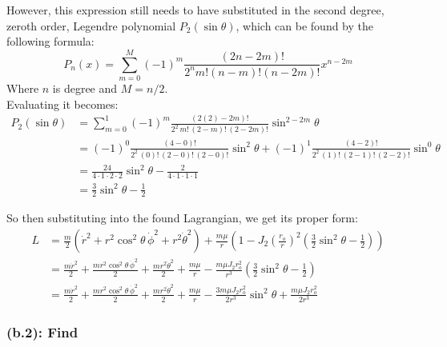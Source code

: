 \documentclass[titlepage]{article}
\begin{document}
However, this expression still needs to have substituted in the second degree, zeroth order, Legendre polynomial $P_2(\sin\theta)$, which can be found by the following formula:
\begin{equation}
	P_n(x)=\sum_{m=0}^{M}(-1)^m\frac{(2n-2m)!}{2^n m!(n-m)!(n-2m)!}x^{n-2m}
\end{equation} 
Where $n$ is degree and $M=n/2$.\\

Evaluating it becomes:
\begin{equation}
	\begin{split}
		P_2(\sin\theta)&=\sum_{m=0}^{1}(-1)^m\frac{(2(2)-2m)!}{2^2\,m!\,(2-m)!\,(2-2m)!}\sin^{2-2m}\theta \\
		&=(-1)^0\frac{(4-0)!}{2^2\,(0)!\,(2-0)!\,(2-0)!}\sin^{2}\theta+(-1)^1\frac{(4-2)!}{2^2\,(1)!\,(2-1)!\,(2-2)!}\sin^{0}\theta \\
		&=\frac{24}{4\cdot1\cdot2\cdot2}\sin^2\theta-\frac{2}{4\cdot1\cdot1\cdot1} \\
		&=\frac{3}{2}\sin^2\theta-\frac{1}{2}
	\end{split}
\end{equation}

\begin{mdframed}[linewidth=1pt, innertopmargin=10pt, innerbottommargin=10pt]
	So then substituting into the found Lagrangian, we get its proper form:
	\begin{equation}
		\begin{split}
			L&=\frac{m}{2}\left(\dot{r}^2+r^2\cos^2\theta\,\dot{\phi}^2+r^2\dot{\theta}^2\right)+\frac{m\mu}{r}\left(1-J_2\left(\frac{r_o}{r}\right)^2\left(\frac{3}{2}\sin^2\theta-\frac{1}{2}\right)\right) \\
			&=\frac{m\dot{r}^2}{2}+\frac{mr^2\cos^2\theta\,\dot{\phi}^2}{2}+\frac{mr^2\dot{\theta}^2}{2}+\frac{m\mu}{r}-\frac{m\mu J_2r_o^2}{r^3}\left(\frac{3}{2}\sin^2\theta-\frac{1}{2}\right) \\
			&=\frac{m\dot{r}^2}{2}+\frac{mr^2\cos^2\theta\,\dot{\phi}^2}{2}+\frac{mr^2\dot{\theta}^2}{2}+\frac{m\mu}{r}-\frac{3m\mu J_2r_o^2}{2r^3}\sin^2\theta+\frac{m\mu J_2r_o^2}{2r^3}
			\label{eq:lagrangianb}
		\end{split}
	\end{equation}
\end{mdframed}

\subsubsection*{(b.2): Find}
\end{document}
